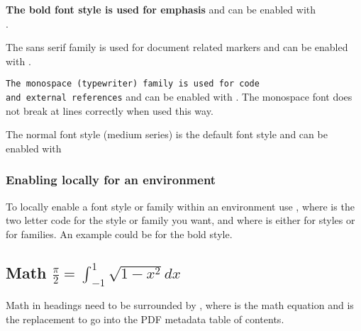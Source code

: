 \textbf{The bold font style is used for emphasis}
and can be enabled with\\ .

\textsf{The sans serif family is used for document related markers}
and can be enabled with .

\texttt{The monospace (typewriter) family is used for code}\\
\texttt{and external references}
and can be enabled with .
The monospace font does not break at lines correctly when used this way.

\textmd{The normal font style (medium series) is the default font style}
and can be enabled with 

\subsubsection{Enabling locally for an environment}
To locally enable a font style or family within an environment use ,
where  is the two letter code for the style or family you want,
and where  is either
 for styles
or  for  families.
An example could be  for the bold style.


\subsection{Math
    \texorpdfstring
        {$\frac{\pi}{2} = \int_{-1}^{1} \sqrt{1-x^2}dx$}
        {equation pi calculated by integral}
}
Math in headings need to be surrounded by ,
where  is the math equation
and  is the replacement to go into the PDF metadata table of contents.

